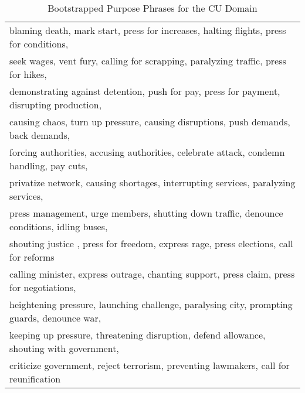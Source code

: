 \begin{table}[htbp]
\begin{tabular}[center]{|l|}
blaming death, mark start, press for increases, halting flights, press for conditions, \\
seek wages, vent fury, calling for scrapping, paralyzing traffic, press for hikes, \\
demonstrating against detention, push for pay, press for payment, disrupting production, \\
causing chaos, turn up pressure, causing disruptions, push demands, back demands, \\
forcing authorities, accusing authorities, celebrate attack, condemn handling, pay cuts, \\
privatize network, causing shortages, interrupting services, paralyzing services, \\
press management, urge members, shutting down traffic, denounce conditions, idling buses, \\
shouting justice	, press for freedom, express rage, press elections, call for reforms\\
calling minister, express outrage, chanting support, press claim, press for negotiations, \\
heightening pressure, launching challenge, paralysing city, prompting guards, denounce war, \\
keeping up pressure, threatening disruption, defend allowance, shouting with government, \\
criticize government, reject terrorism, preventing lawmakers, call for reunification \\

\hline

\end{tabular}
\caption{Bootstrapped Purpose Phrases for the CU Domain}
\label{purpose-phrase-table}
\end{table}




